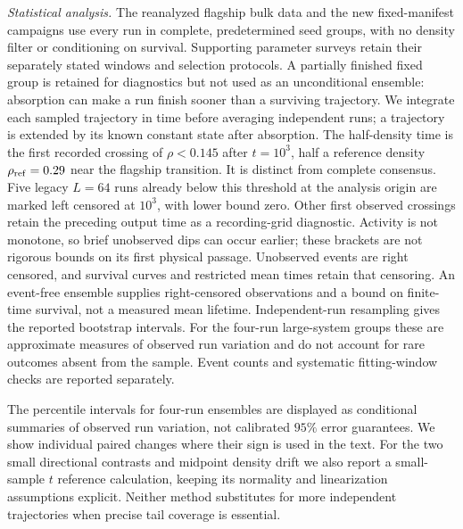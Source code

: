 \textit{Statistical analysis.} The reanalyzed flagship bulk data and the new
fixed-manifest campaigns use every run in complete, predetermined seed groups,
with no density filter or conditioning on survival. Supporting parameter surveys
retain their separately stated windows and selection protocols.
A partially finished fixed group is retained for diagnostics but not
used as an unconditional ensemble: absorption can make a run finish sooner
than a surviving trajectory. We integrate each sampled
trajectory in time before averaging independent runs; a trajectory is extended
by its known constant state after absorption. The half-density time is the first
recorded crossing of $\rho<0.145$ after $t=10^3$, half a reference density
$\rho_{\rm ref}=0.29$ near the flagship transition. It is distinct from complete
consensus. Five legacy $L=64$ runs already below this threshold at the analysis
origin are marked left censored at $10^3$, with lower bound zero. Other
first observed crossings retain the preceding output time as a recording-grid
diagnostic. Activity is not monotone, so brief unobserved dips can occur earlier;
these brackets are not rigorous bounds on its first physical passage.
Unobserved events are right censored, and survival curves and restricted mean times retain
that censoring. An event-free ensemble supplies right-censored observations
and a bound on finite-time survival, not a measured mean lifetime.
Independent-run resampling gives the reported bootstrap
intervals. For the four-run large-system groups these are approximate measures
of observed run variation and do not account for rare outcomes absent from
the sample. Event counts and systematic fitting-window checks are reported
separately.


The percentile intervals for four-run ensembles are displayed as conditional
summaries of observed run variation, not calibrated $95\%$ error guarantees.
We show individual paired changes where their sign is used in the text.
For the two small directional contrasts and midpoint density drift we also
report a small-sample $t$ reference calculation, keeping its normality and
linearization assumptions explicit. Neither method substitutes for more
independent trajectories when precise tail coverage is essential.
